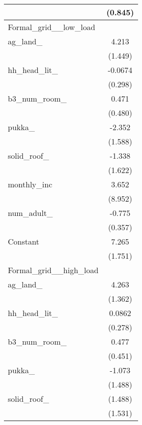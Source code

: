 {\begin{tabular}{l*{1}{c}}
                    &     (0.845)         \\
\midrule
Formal\_grid\_\_low\_load&                     \\
ag\_land\_            &       4.213\sym{***}\\
                    &     (1.449)         \\
\addlinespace
hh\_head\_lit\_        &     -0.0674         \\
                    &     (0.298)         \\
\addlinespace
b3\_num\_room\_        &       0.471         \\
                    &     (0.480)         \\
\addlinespace
pukka\_              &      -2.352         \\
                    &     (1.588)         \\
\addlinespace
solid\_roof\_         &      -1.338         \\
                    &     (1.622)         \\
\addlinespace
monthly\_inc         &       3.652         \\
                    &     (8.952)         \\
\addlinespace
num\_adult\_          &      -0.775\sym{**} \\
                    &     (0.357)         \\
\addlinespace
Constant            &       7.265\sym{***}\\
                    &     (1.751)         \\
\midrule
Formal\_grid\_\_high\_load&                     \\
ag\_land\_            &       4.263\sym{***}\\
                    &     (1.362)         \\
\addlinespace
hh\_head\_lit\_        &      0.0862         \\
                    &     (0.278)         \\
\addlinespace
b3\_num\_room\_        &       0.477         \\
                    &     (0.451)         \\
\addlinespace
pukka\_              &      -1.073         \\
                    &     (1.488)         \\
\addlinespace
solid\_roof\_        &     (1.488)         \\
                    &     (1.531)         \\

\end{tabular}}
